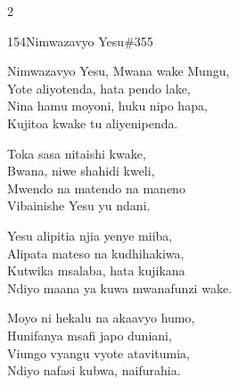 \begin{multicols}{2}
\begin{hymn}{154}{Nimwazavyo Yesu}{\#355}
\begin{stanza}
Nimwazavyo Yesu, Mwana wake Mungu,\\
Yote aliyotenda, hata pendo lake,\\
Nina hamu moyoni, huku nipo hapa,\\
Kujitoa kwake tu aliyenipenda.
\end{stanza}
\begin{chorus}
Toka sasa nitaishi kwake,\\
Bwana, niwe shahidi kweli,\\
Mwendo na matendo na maneno\\
Vibainishe Yesu yu ndani.
\end{chorus}
\begin{stanza}
Yesu alipitia njia yenye miiba,\\
Alipata mateso na kudhihakiwa,\\
Kutwika msalaba, hata kujikana\\
Ndiyo maana ya kuwa mwanafunzi wake.
\end{stanza}
\begin{stanza}
Moyo ni hekalu na akaavyo humo,\\
Hunifanya msafi japo duniani,\\
Viungo vyangu vyote atavitumia,\\
Ndiyo nafasi kubwa, naifurahia.
\end{stanza}
\end{hymn}


\end{multicols}
